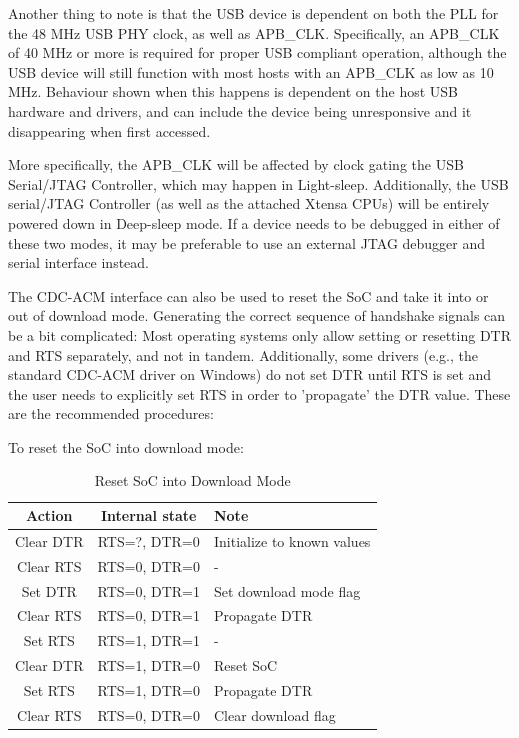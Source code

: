\documentclass[main\_\_EN.tex]{subfiles}
\begin{document}
Another thing to note is that the USB device is dependent on both the PLL for the 48 MHz USB PHY clock, as well as APB\_CLK. Specifically, an APB\_CLK of 40 MHz or more is required for proper USB compliant operation, although the USB device will still function with most hosts with an APB\_CLK as low as 10 MHz. Behaviour shown when this happens is dependent on the host USB hardware and drivers, and can include the device being unresponsive and it disappearing when first accessed.

More specifically, the APB\_CLK will be affected by clock gating the USB Serial/JTAG Controller, which may happen in Light-sleep. Additionally, the USB serial/JTAG Controller (as well as the attached Xtensa CPUs) will be entirely powered down in Deep-sleep mode. If a device needs to be debugged in either of these two modes, it may be preferable to use an external JTAG debugger and serial interface instead.

The CDC-ACM interface can also be used to reset the SoC and take it into or out of download mode. Generating the correct sequence of handshake signals can be a bit complicated: Most operating systems only allow setting or resetting DTR and RTS separately, and not in tandem. Additionally, some drivers (e.g., the standard CDC-ACM driver on Windows) do not set DTR until RTS is set and the user needs to explicitly set RTS in order to 'propagate' the DTR value. These are the recommended procedures:

To reset the SoC into download mode:

\begin{table}[H]
    \centering
    \caption{Reset SoC into Download Mode}
    \label{tab:usbserialjtag-reset-soc-into-download-mode}
    \begin{tabular} {|c|c|l|}
    \hline
        \rowcolor{lightgray}
        \textbf{Action} & \textbf{Internal state} & \textbf{Note} \\\hline

        Clear DTR & RTS=?, DTR=0 & Initialize to known values \\\hline
        Clear RTS & RTS=0, DTR=0 & - \\\hline
        Set DTR & RTS=0, DTR=1 & Set download mode flag \\\hline
        Clear RTS & RTS=0, DTR=1 & Propagate DTR \\\hline
        Set RTS & RTS=1, DTR=1 & - \\\hline
        Clear DTR & RTS=1, DTR=0 & Reset SoC \\\hline
        Set RTS & RTS=1, DTR=0 & Propagate DTR \\\hline
        Clear RTS & RTS=0, DTR=0 & Clear download flag\\\hline
    \end{tabular}
\end{table}
\end{document}
